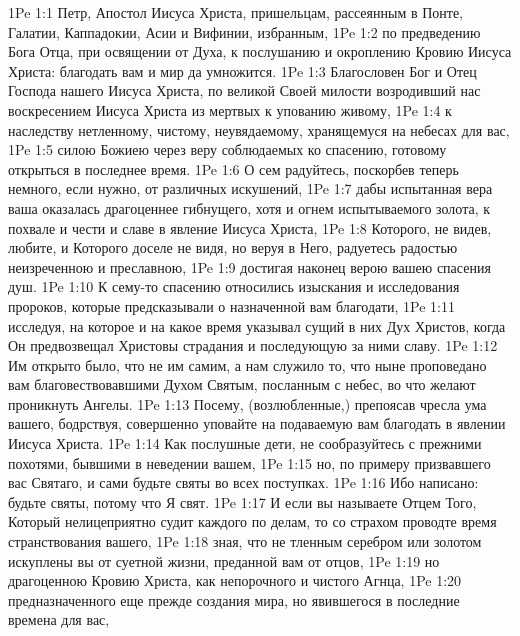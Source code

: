\vs 1Pe 1:1 Петр, Апостол Иисуса Христа, пришельцам, рассеянным в Понте, Галатии, Каппадокии, Асии и Вифинии, избранным,
\vs 1Pe 1:2 по предведению Бога Отца, при освящении от Духа, к послушанию и окроплению Кровию Иисуса Христа: благодать вам и мир да умножится.
\rsbpar\vs 1Pe 1:3 Благословен Бог и Отец Господа нашего Иисуса Христа, по великой Своей милости возродивший нас воскресением Иисуса Христа из мертвых к упованию живому,
\vs 1Pe 1:4 к наследству нетленному, чистому, неувядаемому, хранящемуся на небесах для вас,
\vs 1Pe 1:5 силою Божиею через веру соблюдаемых ко спасению, готовому открыться в последнее время.
\vs 1Pe 1:6 О сем радуйтесь, поскорбев теперь немного, если нужно, от различных искушений,
\vs 1Pe 1:7 дабы испытанная вера ваша оказалась драгоценнее гибнущего, хотя и огнем испытываемого золота, к похвале и чести и славе в явление Иисуса Христа,
\vs 1Pe 1:8 Которого, не видев, любите, и Которого доселе не видя, но веруя в Него, радуетесь радостью неизреченною и преславною,
\vs 1Pe 1:9 достигая наконец верою вашею спасения душ.
\vs 1Pe 1:10 К сему-то спасению относились изыскания и исследования пророков, которые предсказывали о назначенной вам благодати,
\vs 1Pe 1:11 исследуя, на которое и на какое время указывал сущий в них Дух Христов, когда Он предвозвещал Христовы страдания и последующую за ними славу.
\vs 1Pe 1:12 Им открыто было, что не им самим, а нам служило то, что ныне проповедано вам благовествовавшими Духом Святым, посланным с небес, во что желают проникнуть Ангелы.
\rsbpar\vs 1Pe 1:13 Посему, (возлюбленные,) препоясав чресла ума вашего, бодрствуя, совершенно уповайте на подаваемую вам благодать в явлении Иисуса Христа.
\vs 1Pe 1:14 Как послушные дети, не сообразуйтесь с прежними похотями, бывшими в неведении вашем,
\vs 1Pe 1:15 но, по примеру призвавшего вас Святаго, и сами будьте святы во всех поступках.
\vs 1Pe 1:16 Ибо написано: будьте святы, потому что Я свят.
\vs 1Pe 1:17 И если вы называете Отцем Того, Который нелицеприятно судит каждого по делам, то со страхом проводте время странствования вашего,
\vs 1Pe 1:18 зная, что не тленным серебром или золотом искуплены вы от суетной жизни, преданной вам от отцов,
\vs 1Pe 1:19 но драгоценною Кровию Христа, как непорочного и чистого Агнца,
\vs 1Pe 1:20 предназначенного еще прежде создания мира, но явившегося в последние времена для вас,

